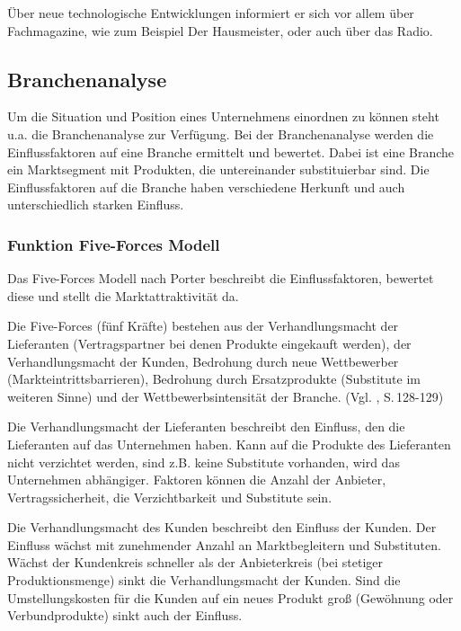         Über neue technologische Entwicklungen informiert er sich vor allem über Fachmagazine, wie zum Beispiel \as Der
        Hausmeister\adl, oder auch über das Radio.

    \subsection{Branchenanalyse} \label{Branchen}
        Um die Situation und Position eines Unternehmens einordnen zu können steht u.a. die Branchenanalyse zur
        Verfügung. Bei der Branchenanalyse werden die Einflussfaktoren auf eine Branche ermittelt und bewertet. Dabei
        ist eine Branche ein Marktsegment mit Produkten, die untereinander substituierbar sind. Die Einflussfaktoren auf
        die Branche haben verschiedene Herkunft und auch unterschiedlich starken Einfluss.

        \subsubsection{Funktion Five-Forces Modell}

        \noindent
        Das Five-Forces Modell nach Porter beschreibt die Einflussfaktoren, bewertet diese und stellt die
        Marktattraktivität da.

        \noindent
        Die Five-Forces (fünf Kräfte) bestehen aus der Verhandlungsmacht der Lieferanten (Vertragspartner bei denen
        Produkte eingekauft werden), der Verhandlungsmacht der Kunden, Bedrohung durch neue Wettbewerber 
        (Markteintrittsbarrieren), Bedrohung durch Ersatzprodukte (Substitute im weiteren Sinne) und der
        Wettbewerbsintensität der Branche. (Vgl. \cite{Gamayanto2005}, S.\,128-129)

        \noindent
        Die Verhandlungsmacht der Lieferanten beschreibt den Einfluss, den die Lieferanten auf das Unternehmen haben.
        Kann auf die Produkte des Lieferanten nicht verzichtet werden, sind z.B. keine Substitute vorhanden, wird das 
        Unternehmen abhängiger. Faktoren können die Anzahl der Anbieter, Vertragssicherheit, die Verzichtbarkeit und
        Substitute sein.

        \noindent
        Die Verhandlungsmacht des Kunden beschreibt den Einfluss der Kunden. Der Einfluss wächst mit zunehmender Anzahl
        an Marktbegleitern und Substituten. Wächst der Kundenkreis schneller als der Anbieterkreis (bei stetiger
        Produktionsmenge) sinkt die Verhandlungsmacht der Kunden. Sind die Umstellungskosten für die Kunden auf ein
        neues Produkt groß (Gewöhnung oder Verbundprodukte) sinkt auch der Einfluss.

